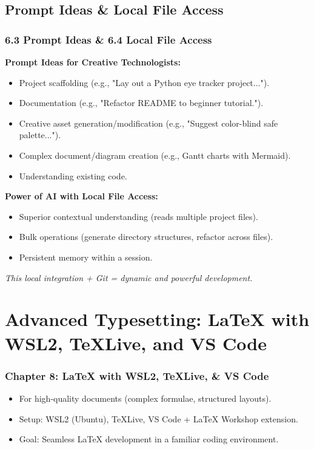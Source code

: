 \documentclass{beamer}
\begin{document}
\subsection{Prompt Ideas \& Local File Access}
\begin{frame}
  \frametitle{6.3 Prompt Ideas \& 6.4 Local File Access}
  \textbf{Prompt Ideas for Creative Technologists:}
  \begin{itemize}
    \item Project scaffolding (e.g., "Lay out a Python eye tracker project...").
    \item Documentation (e.g., "Refactor README to beginner tutorial.").
    \item Creative asset generation/modification (e.g., "Suggest color-blind safe palette...").
    \item Complex document/diagram creation (e.g., Gantt charts with Mermaid).
    \item Understanding existing code.
  \end{itemize}
  \pause
  \textbf{Power of AI with Local File Access:}
  \begin{itemize}
    \item Superior contextual understanding (reads multiple project files).
    \item Bulk operations (generate directory structures, refactor across files).
    \item Persistent memory within a session.
  \end{itemize}
  \textit{This local integration + Git = dynamic and powerful development.}
\end{frame}

\section{Advanced Typesetting: LaTeX with WSL2, TeXLive, and VS Code}
\begin{frame}
  \frametitle{Chapter 8: LaTeX with WSL2, TeXLive, \& VS Code}
  \begin{itemize}
    \item For high-quality documents (complex formulae, structured layouts).
    \item Setup: WSL2 (Ubuntu), TeXLive, VS Code + LaTeX Workshop extension.
    \item Goal: Seamless LaTeX development in a familiar coding environment.
  \end{itemize}
\end{frame}
\end{document}
